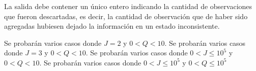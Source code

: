 \documentclass{oci}
\begin{document}
\begin{outputDescription}
  La salida debe contener un único entero indicando la cantidad de observaciones
  que fueron descartadas, es decir, la cantidad de observación que de haber sido
  agregadas hubiesen dejado la información en un estado inconsistente.
\end{outputDescription}

\begin{scoreDescription}
   Se probarán varios casos donde $J=2$ y $0 < Q < 10$.
   Se probarán varios casos donde $J=3$ y $0 < Q < 10$.
   Se probarán varios casos donde $0 < J \leq 10^5$ y $0 < Q < 10$.
   Se probarán varios casos donde $0 < J \leq 10^5$ y $0 < Q \leq 10^5$
\end{scoreDescription}

\begin{sampleDescription}
\end{sampleDescription}
\end{document}
